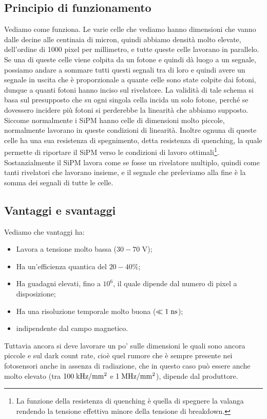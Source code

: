 \subsection{Principio di funzionamento}
Vediamo come funziona. Le varie celle che vediamo hanno dimensioni che vanno dalle decine alle centinaia di micron, quindi abbiamo densità molto elevate, dell'ordine di 1000 pixel per millimetro, e tutte queste celle lavorano in parallelo. Se una di queste celle viene colpita da un fotone e quindi dà luogo a un segnale, possiamo andare a sommare tutti questi segnali tra di loro e quindi avere un segnale in uscita che è proporzionale a quante celle sono state colpite dai fotoni, dunque a quanti fotoni hanno inciso sul rivelatore. La validità di tale schema si basa sul presupposto che su ogni singola cella incida un solo fotone, perché se dovessero incidere più fotoni si perderebbe la linearità che abbiamo supposto. Siccome normalmente i SiPM hanno celle di dimensioni molto piccole, normalmente lavorano in queste condizioni di linearità. Inoltre ognuna di queste celle ha una sua resistenza di spegnimento, detta resistenza di quenching, la quale permette di riportare il SiPM verso le condizioni di lavoro ottimali\footnote{La funzione della resistenza di quenching è quella di spegnere la valanga rendendo la tensione effettiva minore della tensione di breakdown.}. Sostanzialmente il SiPM lavora come se fosse un rivelatore multiplo, quindi come tanti rivelatori che lavorano insieme, e il segnale che preleviamo alla fine è la somma dei segnali di tutte le celle.

\subsection{Vantaggi e svantaggi}
Vediamo che vantaggi ha:
\begin{itemize}[leftmargin=0.5cm]
   \item Lavora a tensione molto bassa ($30-70$ V);
   \item Ha un'efficienza quantica del $20-40\%$;
   \item Ha guadagni elevati, fino a $10^6$, il quale dipende dal numero di pixel a disposizione;
   \item Ha una risoluzione temporale molto buona ($\ll 1 \; \rm ns$);
   \item \E indipendente dal campo magnetico.
\end{itemize}
Tuttavia ancora si deve lavorare un po' sulle dimensioni le quali sono ancora piccole e sul dark count rate, cioè quel rumore che è sempre presente nei fotosensori anche in assenza di radiazione, che in questo caso può essere anche molto elevato (tra $\rm 100 \; kHz/mm^2$ e $\rm 1 \; MHz/mm^2$), dipende dal produttore.

